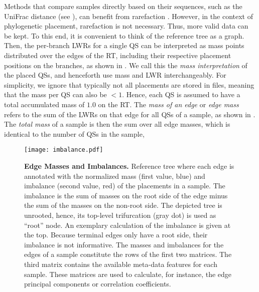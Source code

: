 Methods that compare samples directly based on their sequences,
such as the UniFrac distance \cite{Lozupone2005,Lozupone2007a}
(see ),
can benefit from rarefaction \cite{Weiss2017}.
However, in the context of phylogenetic placement, rarefaction is not necessary.
Thus, more valid data can be kept.
To this end, it is convenient to think of the reference tree as a graph.
Then, the per-branch \acp{LWR} for a single \ac{QS}
can be interpreted as mass points distributed over the edges of the \ac{RT},
including their respective placement positions on the branches, as shown in .
We call this the \emph{mass interpretation} of the placed \acp{QS},
and henceforth use mass and \ac{LWR} interchangeably.
For simplicity, we ignore that typically not all placements are stored in  files,
meaning that the mass per QS can also be $<1$.
Hence, each \ac{QS} is assumed to have a total accumulated mass of $1.0$ on the \ac{RT}.
The \emph{mass of an edge} or \emph{edge mass} refers to the sum of the \acp{LWR} on that edge for all \acp{QS} of a sample,
as shown in .
The \emph{total mass} of a sample is then the sum over all edge masses,
which is identical to the number of \acp{QS} in the sample,

\begin{figure}[!htb]
    \centering
    \texttt{[image: imbalance.pdf]}
    \begin{subfigure}{0pt}
        \label{fig:imbalance:sub:ReferenceTree}
    \end{subfigure}
    \begin{subfigure}{0pt}
        \label{fig:imbalance:sub:Matrices}
    \end{subfigure}
    \caption[Edge Masses and Imbalances]{
        \textbf{Edge Masses and Imbalances.}
        Reference tree where each edge is annotated with the normalized mass (first value, blue) and
        imbalance (second value, red) of the placements in a sample.
        The imbalance is the sum of masses on the root side of the edge minus the sum of the masses on the non-root side.
        The depicted tree is unrooted, hence, its top-level trifurcation (gray dot) is used as ``root'' node.
        An exemplary calculation of the imbalance is given at the top.
        Because terminal edges only have a root side, their imbalance is not informative.
        The masses and imbalances for the edges of a sample constitute the rows of the first two matrices.
        The third matrix contains the available meta-data features for each sample.
        These matrices are used to calculate, for instance, the edge principal components or correlation coefficients.
    }
    \label{fig:imbalance}
\end{figure}

